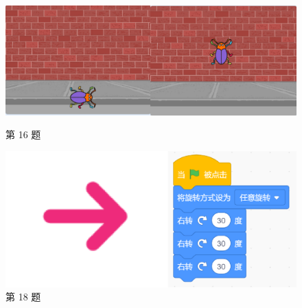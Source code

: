 \documentclass[10pt, a4paper]{article}
\begin{document}
\begin{enumerate}
        \begin{figure}[htbp]
            \centering
            \begin{minipage}[t]{.35\textwidth}
                \centering
                \includegraphics[width=\textwidth]{16.png}
                \caption*{第 16 题}
            \end{minipage}
            \begin{minipage}[t]{.28\textwidth}
                \centering
                \includegraphics[width=\textwidth]{18.png}
                \caption*{第 18 题}
            \end{minipage}
            \begin{minipage}[t]{.15\textwidth}
                \centering

\end{minipage}
\end{figure}
\end{enumerate}
\end{document}
